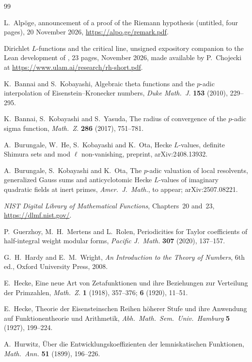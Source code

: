 \documentclass[11pt]{amsart}
\theoremstyle{definition}
\theoremstyle{remark}
\begin{document}
\begin{thebibliography}{99}

 L.~Alp\"oge, announcement of a proof of the Riemann hypothesis (untitled, four
pages), 20 November 2026, \url{https://alpo.ge/remark.pdf}.

 Dirichlet $L$-functions and the critical line, unsigned expository companion to
the Lean development of \cite{Alpoge}, 23 pages, November 2026, made available by P.~Chojecki at
\url{https://www.ulam.ai/research/rh-short.pdf}.

 K.~Bannai and S.~Kobayashi, Algebraic theta functions and the $p$-adic interpolation
of Eisenstein--Kronecker numbers, \emph{Duke Math.\ J.} \textbf{153} (2010), 229--295.

 K.~Bannai, S.~Kobayashi and S.~Yasuda, The radius of convergence of the $p$-adic
sigma function, \emph{Math.\ Z.} \textbf{286} (2017), 751--781.

 A.~Burungale, W.~He, S.~Kobayashi and K.~Ota, Hecke $L$-values, definite Shimura
sets and mod $\ell$ non-vanishing, preprint, arXiv:2408.13932.

 A.~Burungale, S.~Kobayashi and K.~Ota, The $p$-adic valuation of local resolvents,
generalized Gauss sums and anticyclotomic Hecke $L$-values of imaginary quadratic fields at inert
primes, \emph{Amer.\ J.\ Math.}, to appear; arXiv:2507.08221.

 \emph{NIST Digital Library of Mathematical Functions}, Chapters~20 and~23,
\url{https://dlmf.nist.gov/}.

 P.~Guerzhoy, M.~H.~Mertens and L.~Rolen, Periodicities for Taylor coefficients of
half-integral weight modular forms, \emph{Pacific J.\ Math.} \textbf{307} (2020), 137--157.

 G.~H.~Hardy and E.~M.~Wright, \emph{An Introduction to the Theory of Numbers}, 6th
ed., Oxford University Press, 2008.

 E.~Hecke, Eine neue Art von Zetafunktionen und ihre Beziehungen zur Verteilung der
Primzahlen, \emph{Math.\ Z.} \textbf{1} (1918), 357--376; \textbf{6} (1920), 11--51.

 E.~Hecke, Theorie der Eisensteinschen Reihen h\"oherer Stufe und ihre Anwendung auf
Funktionentheorie und Arithmetik, \emph{Abh.\ Math.\ Sem.\ Univ.\ Hamburg} \textbf{5} (1927),
199--224.

 A.~Hurwitz, \"Uber die Entwicklungskoeffizienten der lemniskatischen Funktionen,
\emph{Math.\ Ann.} \textbf{51} (1899), 196--226.


\end{thebibliography}
\end{document}
